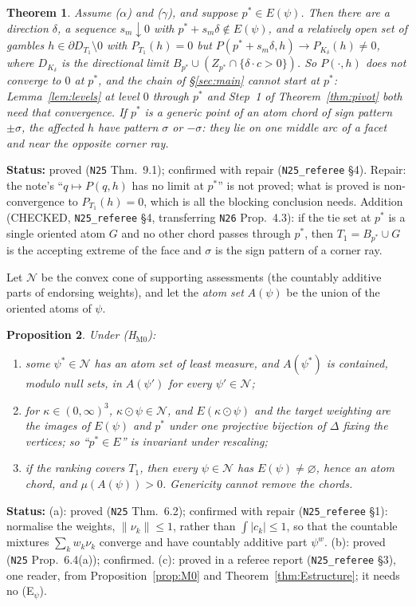 \documentclass[11pt]{article}
\newtheorem{theorem}{Theorem}[section]
\newtheorem{proposition}[theorem]{Proposition}
\theoremstyle{definition}
\theoremstyle{remark}
\newcommand{\src}[1]{\texttt{#1}}
\newcommand{\status}[1]{\par\smallskip\noindent\textbf{Status:} #1\par\smallskip}
\begin{document}
\begin{theorem}\label{thm:pstarE}
Assume ($\alpha$) and ($\gamma$), and suppose $p^*\in E(\psi)$. Then there are a direction $\delta$, a sequence $s_m\downarrow0$ with $p^*+s_m\delta\notin E(\psi)$, and a relatively open set of gambles $h\in\partial D_{T_1}\setminus0$ with $P_{T_1}(h)=0$ but $P(p^*+s_m\delta,h)\to P_{K_\delta}(h)\ne0$, where $D_{K_\delta}$ is the directional limit $B_{p^*}\cup(Z_{p^*}\cap\{\delta\cdot c>0\})$. So $P(\cdot,h)$ does not converge to $0$ at $p^*$, and the chain of \S\ref{sec:main} cannot start at $p^*$: Lemma~\ref{lem:levels} at level $0$ through $p^*$ and Step~1 of Theorem~\ref{thm:pivot} both need that convergence. If $p^*$ is a generic point of an atom chord of sign pattern $\pm\sigma$, the affected $h$ have pattern $\sigma$ or $-\sigma$: they lie on one middle arc of a facet and near the opposite corner ray.
\end{theorem}
\status{proved (\src{N25} Thm.~9.1); confirmed with repair (\src{N25\_referee} \S4). Repair: the note's ``$q\mapsto P(q,h)$ has no limit at $p^*$'' is not proved; what is proved is non-convergence to $P_{T_1}(h)=0$, which is all the blocking conclusion needs. Addition (CHECKED, \src{N25\_referee} \S4, transferring \src{N26} Prop.~4.3): if the tie set at $p^*$ is a single oriented atom $G$ and no other chord passes through $p^*$, then $T_1=B_{p^*}\cup G$ is the accepting extreme of the face and $\sigma$ is the sign pattern of a corner ray.}

Let $\mathcal N$ be the convex cone of supporting assessments (the countably additive parts of endorsing weights), and let the \emph{atom set} $A(\psi)$ be the union of the oriented atoms of $\psi$.

\begin{proposition}\label{prop:generic}
Under (H$_{\mathrm{M0}}$):
\begin{enumerate}[leftmargin=*,label=(\alph*)]
\item some $\psi^*\in\mathcal N$ has an atom set of least measure, and $A(\psi^*)$ is contained, modulo null sets, in $A(\psi')$ for every $\psi'\in\mathcal N$;
\item for $\kappa\in(0,\infty)^3$, $\kappa\odot\psi\in\mathcal N$, and $E(\kappa\odot\psi)$ and the target weighting are the images of $E(\psi)$ and $p^*$ under one projective bijection of $\Delta$ fixing the vertices; so ``$p^*\in E$'' is invariant under rescaling;
\item if the ranking covers $T_1$, then every $\psi\in\mathcal N$ has $E(\psi)\ne\varnothing$, hence an atom chord, and $\mu(A(\psi))>0$. Genericity cannot remove the chords.
\end{enumerate}
\end{proposition}
\status{(a): proved (\src{N25} Thm.~6.2); confirmed with repair (\src{N25\_referee} \S1): normalise the weights, $\|\nu_k\|\le1$, rather than $\int|c_k|\le1$, so that the countable mixtures $\sum_kw_k\nu_k$ converge and have countably additive part $\psi^w$. (b): proved (\src{N25} Prop.~6.4(a)); confirmed. (c): proved in a referee report (\src{N25\_referee} \S3), one reader, from Proposition~\ref{prop:M0} and Theorem~\ref{thm:Estructure}; it needs no (E$_\psi$).}
\end{document}
